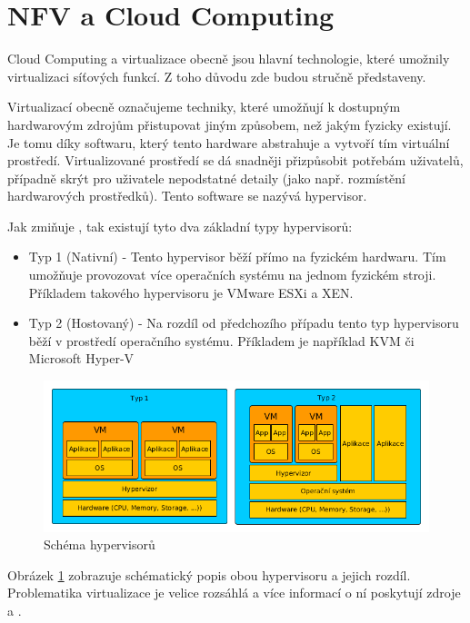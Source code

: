 \section{NFV a Cloud Computing}

Cloud Computing a virtualizace obecně jsou hlavní technologie, které umožnily virtualizaci síťových funkcí. Z toho důvodu zde budou stručně představeny. 

Virtualizací obecně označujeme techniky, které umožňují k dostupným hardwarovým zdrojům přistupovat jiným způsobem, než jakým fyzicky existují. Je tomu díky softwaru, který tento hardware abstrahuje a vytvoří tím virtuální prostředí. Virtualizované prostředí se dá snadněji přizpůsobit potřebám uživatelů, případně skrýt pro uživatele nepodstatné detaily (jako např. rozmístění hardwarových prostředků). Tento software se nazývá hypervisor.\cite{VM_book}

Jak zmiňuje \cite{VM_architektura}, tak existují tyto dva základní typy hypervisorů:

\begin{itemize}
\item Typ 1 (Nativní) - Tento hypervisor běží přímo na fyzickém hardwaru. Tím umožňuje provozovat více operačních systému na jednom fyzickém stroji. Příkladem takového hypervisoru je VMware ESXi a XEN.
\item Typ 2 (Hostovaný) - Na rozdíl od předchozího případu tento typ hypervisoru běží v prostředí operačního systému. Příkladem je například KVM či Microsoft Hyper-V
\end{itemize}

\begin{figure}[h]
\begin{centering}
\includegraphics[scale=0.5]{images/virtualization}
\par\end{centering}
\caption{Schéma hypervisorů \label{fig:virtualization}}
\end{figure}

Obrázek \ref{fig:virtualization} zobrazuje schématický popis obou hypervisoru a jejich rozdíl. Problematika virtualizace je velice rozsáhlá a více informací o ní poskytují zdroje \cite{VM_book} a \cite{VM_architektura}.


